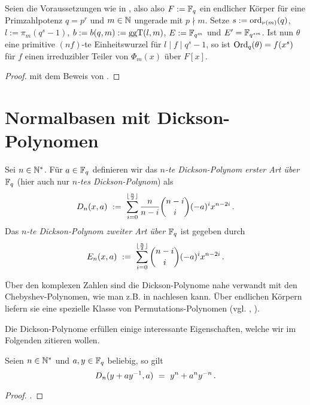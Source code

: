 \begin{lemma}
  \label{lemma:hoehere_wurzeln_auch_erzeuger_reg}
  Seien die Voraussetzungen wie in , also
  also $F := \mathbb{F}_q$ ein endlicher Körper für eine Primzahlpotenz $q = p^r$ 
  und $m\in\mathbb{N}$ ungerade mit $p\nmid m$.
  Setze $s := \operatorname{ord}_{\nu(m)}(q)$, 
  $l := \pi_m(q^s-1)$, $b:= b(q,m) := \operatorname{ggT}(l,m)$, $E := \mathbb{F}_{q^m}$ und
  $E' = \mathbb{F}_{q^{sm}}$. 
  Ist nun $\theta$ eine primitive $(nf)$-te Einheitswurzel für 
  $l \mid f \mid q^s-1$, so ist $\operatorname{Ord}_q(\theta) = f(x^s)$ für 
  $f$ einen irreduzibler Teiler von $\Phi_m(x)$ über $F[x]$.
\end{lemma}
\begin{proof}
   mit dem Beweis von
  .
\end{proof}


\section{Normalbasen mit Dickson-Polynomen}

\begin{definition}
  Sei $n \in \mathbb{N}^\ast$. Für $a \in \mathbb{F}_q$ definieren wir das
  \emph{$n$-te Dickson-Polynom erster Art über $\mathbb{F}_q$} 
  (hier auch nur \emph{$n$-tes Dickson-Polynom}) als
  \[ D_n(x,a) \ :=\  \sum_{i=0}^{\lfloor\frac n 2\rfloor} \frac{n}{n-i}
    \binom{n-i}{i} (-a)^i x^{n-2i}\,.\]
  Das \emph{$n$-te Dickson-Polynom zweiter Art über $\mathbb{F}_q$} ist gegeben durch
  \[ E_n(x,a) \ :=\  \sum_{i=0}^{\lfloor\frac n 2\rfloor} 
    \binom{n-i}{i} (-a)^i x^{n-2i}\,.\]
\end{definition}

\begin{bemerkung}
  Über den komplexen Zahlen sind die Dickson-Polynome 
  nahe verwandt mit den
  Chebyshev-Polynomen, wie man z.B. in \autocite[Absatz nach Corollary
  7.15]{lidl1997finite} nachlesen kann.
  Über endlichen Körpern liefern sie eine spezielle Klasse von
  Permutations-Polynomen (vgl. \autocite[Theorem 7.16]{lidl1997finite}, 
  \autocite[Section 9.6]{mullen2013handbook}).
\end{bemerkung}

Die Dickson-Polynome erfüllen einige interessante Eigenschaften, 
welche wir im Folgenden zitieren wollen.

\begin{satz}
  \label{satz:dickson_1}
   Seien $n\in \mathbb{N}^\ast$ und $a,y\in \mathbb{F}_q$ beliebig, so gilt
  \[ D_n(y+ay^{-1}, a) \ =\  y^n +a^ny^{-n}\,.\]
\end{satz}
\begin{proof}
  \autocite[Gleichung (7.8)]{lidl1997finite}.
\end{proof}

